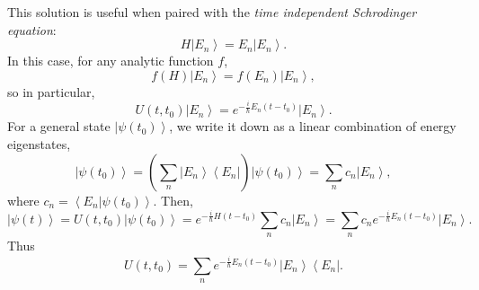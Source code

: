 \documentclass[phys334]{subfiles}
\begin{document}
    This solution is useful when paired with the \textit{time independent Schrodinger equation}:
    \begin{equation*}
        H\left| E_n \right\rangle = E_n\left| E_n \right\rangle.
    \end{equation*}
    In this case, for any analytic function $f$,
    \begin{equation*}
        f\left( H \right)\left| E_n \right\rangle = f\left( E_n \right)\left| E_n \right\rangle,
    \end{equation*}
    so in particular,
    \begin{equation*}
        U\left( t,t_0 \right)\left| E_n \right\rangle = e^{-\frac{i}{\hbar}E_n\left( t-t_0 \right)}\left| E_n \right\rangle.
    \end{equation*}
    For a general state $\left| \psi\left( t_0 \right) \right\rangle$, we write it down as a linear combination of energy eigenstates,
    \begin{equation*}
        \left| \psi\left( t_0 \right) \right\rangle = \left( \sum^{}_{n} \left| E_n \right\rangle \left\langle E_n \right| \right) \left| \psi\left( t_0 \right) \right\rangle = \sum^{}_{n} c_n\left| E_n \right\rangle,
    \end{equation*}
    where $c_n = \left\langle E_n | \psi\left( t_0 \right) \right\rangle$. Then,
    \begin{equation*}
\left| \psi\left( t \right) \right\rangle = U\left( t,t_0 \right)\left| \psi\left( t_0 \right) \right\rangle = e^{-\frac{i}{\hbar}H\left( t-t_0 \right)} \sum^{}_{n}c_n\left| E_n \right\rangle = \sum^{}_{n} c_n e^{-\frac{i}{\hbar}E_n\left( t-t_0 \right)} \left| E_n \right\rangle.
    \end{equation*}
    Thus
    \begin{equation*}
        U\left( t,t_0 \right) = \sum^{}_{n} e^{-\frac{i}{\hbar}E_n\left( t-t_0 \right)} \left| E_n \right\rangle \left\langle E_n \right|.
    \end{equation*}
\end{document}
